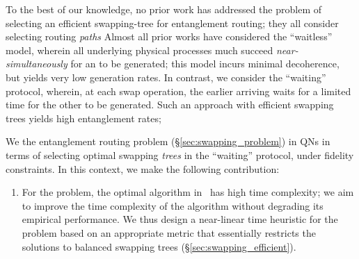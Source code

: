 To the best of our knowledge, no prior work has addressed the problem of selecting an efficient
swapping-tree for entanglement routing; they all consider selecting routing \textit{paths} 
Almost all prior works have considered the ``waitless''
model, wherein all underlying physical processes much succeed \textit{near-simultaneously} for 
an \eps to be generated; this model incurs minimal decoherence, but yields
very low \eps generation rates. 
In contrast, we consider the ``waiting'' protocol, wherein, at each swap operation, the earlier arriving 
\eps waits for a limited time for the other \eps to be generated. Such an approach with efficient swapping trees yields high entanglement rates; 

We  the entanglement routing problem (\S\ref{sec:swapping_problem})
in QNs in terms of selecting optimal swapping \textit{trees} in the ``waiting'' protocol, under fidelity
constraints. In this context, we make the following contribution:
\begin{enumerate}

\item
For the \spp problem, the optimal algorithm in~\cite{swapping-tqe-22} has high time complexity; 
we aim to improve the time complexity of the algorithm without degrading its empirical performance.
We thus design a near-linear time heuristic for the \spp problem based on an appropriate metric 
that essentially restricts the solutions to balanced swapping trees (\S\ref{sec:swapping_efficient}).

\end{enumerate}


